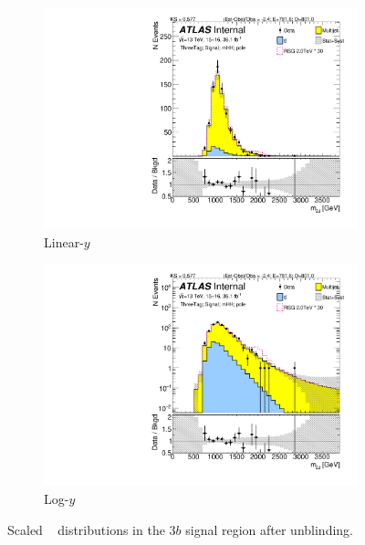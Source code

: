 \begin{figure}[htb!]
\begin{center}
    \captionsetup{justification=centering}
    \begin{subfigure}[b]{0.45\textwidth}
        \includegraphics[width=\textwidth,angle=-90]{figures/boosted/Signal_Syst/Moriond_bkg_9_ThreeTag_Signal_mHH_pole.pdf}
        \caption{Linear-$y$}
        \label{fig:boosted-3b-signal-pole-lin}
    \end{subfigure}
    \quad
    \begin{subfigure}[b]{0.45\textwidth}
        \includegraphics[width=\textwidth,angle=-90]{figures/boosted/Signal_Syst/Moriond_bkg_9_ThreeTag_Signal_mHH_pole_1.pdf}
        \caption{Log-$y$}
        \label{fig:boosted-3b-signal-pole-log}
    \end{subfigure}
  \caption{Scaled \mtwoJ~ distributions in the $3b$ signal region after unblinding.}
  \label{fig:boosted-3b-signal-pole}
\end{center}
\end{figure}

